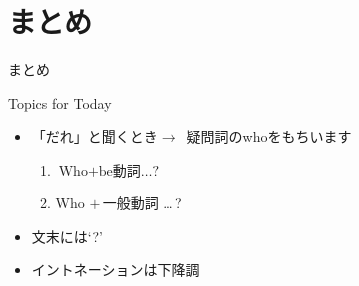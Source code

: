 \documentclass[aspectratio=169]{beamer}
\begin{document}
\section{まとめ}
\begin{frame}[plain]{まとめ}
 
\begin{block}{Topics for Today}
\pause
\begin{itemize}[square]\small
 \item 「だれ」と聞くとき$\longrightarrow$\,\,\,疑問詞のwhoをもちいます
        \begin{enumerate}
	 \item $\text{Who}+\text{be動詞\ldots ?}$
	 \item Who $+\,\text{一般動詞}$ \ldots\,?
	\end{enumerate}
 \item 文末には`?'
 \item イントネーションは下降調\,\myDownwardPitch{}\,\,
\end{itemize}
     \end{block}
\end{frame}
\end{document}
